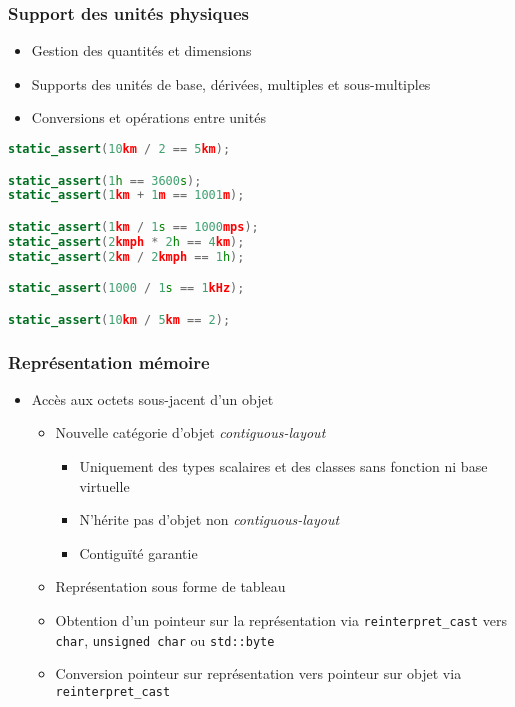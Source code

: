 \documentclass[C++.tex]{subfiles}
\begin{document}
\begin{frame}[fragile]
	\frametitle{Support des unités physiques}
	\begin{itemize}
		\item Gestion des quantités et dimensions
		\item Supports des unités de base, dérivées, multiples et sous-multiples
		\item Conversions et opérations entre unités
	\end{itemize}

	\begin{lstlisting}[language=C++]
static_assert(10km / 2 == 5km);

static_assert(1h == 3600s);
static_assert(1km + 1m == 1001m);

static_assert(1km / 1s == 1000mps);
static_assert(2kmph * 2h == 4km);
static_assert(2km / 2kmph == 1h);

static_assert(1000 / 1s == 1kHz);

static_assert(10km / 5km == 2);\end{lstlisting}
\end{frame}

\begin{frame}[fragile]
	\frametitle{Représentation mémoire}
	\begin{itemize}
		\item Accès aux octets sous-jacent d'un objet
		\begin{itemize}
			\item Nouvelle catégorie d'objet \textit{contiguous-layout}
			\begin{itemize}
				\item Uniquement des types scalaires et des classes sans fonction ni base virtuelle
				\item N'hérite pas d'objet non \textit{contiguous-layout}
				\item Contiguïté garantie
			\end{itemize}
			\item Représentation sous forme de tableau
			\item Obtention d'un pointeur sur la représentation via \lstinline|reinterpret_cast| vers \lstinline|char|, \lstinline|unsigned char| ou \lstinline|std::byte|
			\item Conversion pointeur sur représentation vers pointeur sur objet via \lstinline|reinterpret_cast|
		\end{itemize}
	\end{itemize}
\end{frame}
\end{document}

